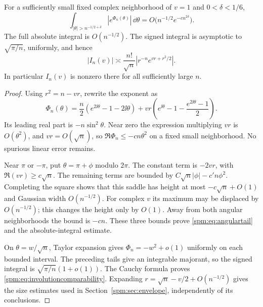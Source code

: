 \begin{lemma}\label{spm:lem:involution}
For a sufficiently small fixed complex neighborhood of $v=1$ and $0<\delta<1/6$,
\begin{equation}\label{spm:eq:angulartail}
 \int_{|\theta|>n^{-1/2+\delta}}|e^{\Phi_n(\theta)}|\,\dd\theta
 =O\bigl(n^{-1/2}e^{-c n^{2\delta}}\bigr).
\end{equation}
The full absolute integral is $O(n^{-1/2})$. The signed integral is asymptotic to $\sqrt{\pi/n}$, uniformly, and hence
\begin{equation}\label{spm:eq:involutioncomparability}
 |I_n(v)|\asymp
 \frac{n!}{\sqrt n}\left|r^{-n}e^{vr+r^2/2}\right|.
\end{equation}
In particular $I_n(v)$ is nonzero there for all sufficiently large $n$.
\end{lemma}
\begin{proof}
Using $r^2=n-vr$, rewrite the exponent as
\[
 \Phi_n(\theta)=\frac n2(e^{2\ii\theta}-1-2\ii\theta)
 +vr\left(e^{\ii\theta}-1-\frac{e^{2\ii\theta}-1}{2}\right).
\]
Its leading real part is $-n\sin^2\theta$. Near zero the expression multiplying $vr$ is $O(\theta^2)$, and $vr=O(\sqrt n)$, so $\Re\Phi_n\leq-cn\theta^2$ on a fixed small neighborhood. No spurious linear error remains.

Near $\pi$ or $-\pi$, put $\theta=\pi+\phi$ modulo $2\pi$. The constant term is $-2vr$, with $\Re(vr)\geq c\sqrt n$. The remaining terms are bounded by $C\sqrt n|\phi|-c'n\phi^2$. Completing the square shows that this saddle has height at most $-c\sqrt n+O(1)$ and Gaussian width $O(n^{-1/2})$. For complex $v$ its maximum may be displaced by $O(n^{-1/2})$; this changes the height only by $O(1)$. Away from both angular neighborhoods the bound is $-cn$. These three bounds prove \eqref{spm:eq:angulartail} and the absolute-integral estimate.

On $\theta=w/\sqrt n$, Taylor expansion gives $\Phi_n=-w^2+o(1)$ uniformly on each bounded interval. The preceding tails give an integrable majorant, so the signed integral is $\sqrt{\pi/n}(1+o(1))$. The Cauchy formula proves \eqref{spm:eq:involutioncomparability}. Expanding $r=\sqrt n-v/2+O(n^{-1/2})$ gives the size estimates used in Section~\ref{spm:sec:envelope}, independently of its conclusions.
\end{proof}

